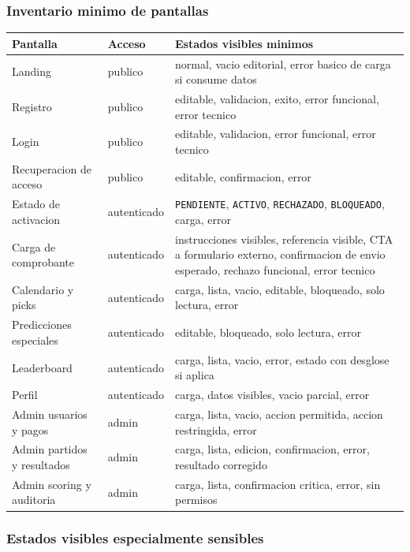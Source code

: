 \subsubsection{Inventario minimo de pantallas}

\begin{longtable}{p{}p{}p{}}
\toprule
\textbf{Pantalla} & \textbf{Acceso} & \textbf{Estados visibles minimos} \\
\midrule
Landing & publico & normal, vacio editorial, error basico de carga si consume datos \\
Registro & publico & editable, validacion, exito, error funcional, error tecnico \\
Login & publico & editable, validacion, error funcional, error tecnico \\
Recuperacion de acceso & publico & editable, confirmacion, error \\
Estado de activacion & autenticado & \texttt{PENDIENTE}, \texttt{ACTIVO}, \texttt{RECHAZADO}, \texttt{BLOQUEADO}, carga, error \\
Carga de comprobante & autenticado & instrucciones visibles, referencia visible, CTA a formulario externo, confirmacion de envio esperado, rechazo funcional, error tecnico \\
Calendario y picks & autenticado & carga, lista, vacio, editable, bloqueado, solo lectura, error \\
Predicciones especiales & autenticado & editable, bloqueado, solo lectura, error \\
Leaderboard & autenticado & carga, lista, vacio, error, estado con desglose si aplica \\
Perfil & autenticado & carga, datos visibles, vacio parcial, error \\
Admin usuarios y pagos & admin & carga, lista, vacio, accion permitida, accion restringida, error \\
Admin partidos y resultados & admin & carga, lista, edicion, confirmacion, error, resultado corregido \\
Admin scoring y auditoria & admin & carga, lista, confirmacion critica, error, sin permisos \\
\bottomrule
\end{longtable}

\subsubsection{Estados visibles especialmente sensibles}

